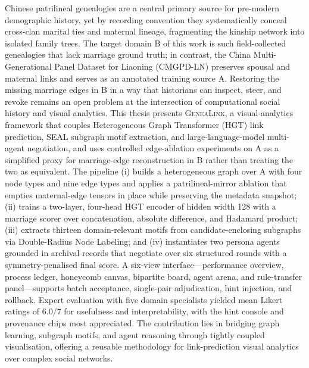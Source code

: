 Chinese patrilineal genealogies are a central primary source for pre-modern demographic history, yet by recording convention they systematically conceal cross-clan marital ties and maternal lineage, fragmenting the kinship network into isolated family trees. The target domain B of this work is such field-collected genealogies that lack marriage ground truth; in contrast, the China Multi-Generational Panel Dataset for Liaoning (CMGPD-LN) preserves spousal and maternal links and serves as an annotated training source A. Restoring the missing marriage edges in B in a way that historians can inspect, steer, and revoke remains an open problem at the intersection of computational social history and visual analytics. This thesis presents \textsc{GeneaLink}, a visual-analytics framework that couples Heterogeneous Graph Transformer (HGT) link prediction, SEAL subgraph motif extraction, and large-language-model multi-agent negotiation, and uses controlled edge-ablation experiments on A as a simplified proxy for marriage-edge reconstruction in B rather than treating the two as equivalent. The pipeline (i) builds a heterogeneous graph over A with four node types and nine edge types and applies a patrilineal-mirror ablation that empties maternal-edge tensors in place while preserving the metadata snapshot; (ii) trains a two-layer, four-head HGT encoder of hidden width 128 with a marriage scorer over concatenation, absolute difference, and Hadamard product; (iii) extracts thirteen domain-relevant motifs from candidate-enclosing subgraphs via Double-Radius Node Labeling; and (iv) instantiates two persona agents grounded in archival records that negotiate over six structured rounds with a symmetry-penalised final score. A six-view interface---performance overview, process ledger, honeycomb canvas, bipartite board, agent arena, and rule-transfer panel---supports batch acceptance, single-pair adjudication, hint injection, and rollback. Expert evaluation with five domain specialists yielded mean Likert ratings of 6.0/7 for usefulness and interpretability, with the hint console and provenance chips most appreciated. The contribution lies in bridging graph learning, subgraph motifs, and agent reasoning through tightly coupled visualisation, offering a reusable methodology for link-prediction visual analytics over complex social networks.

